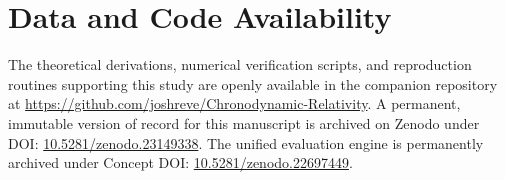 \documentclass[aps,prd,reprint,superscriptaddress,nofootinbib,floatfix,amsmath,amssymb]{revtex4-2}
\begin{document}
\section*{Data and Code Availability}
The theoretical derivations, numerical verification scripts, and reproduction routines supporting this study are openly available in the companion repository at \url{https://github.com/joshreve/Chronodynamic-Relativity}. A permanent, immutable version of record for this manuscript is archived on Zenodo under DOI: \href{https://doi.org/10.5281/zenodo.23149338}{10.5281/zenodo.23149338}. The unified evaluation engine is permanently archived under Concept DOI: \href{https://doi.org/10.5281/zenodo.22697449}{10.5281/zenodo.22697449}.


\end{document}
